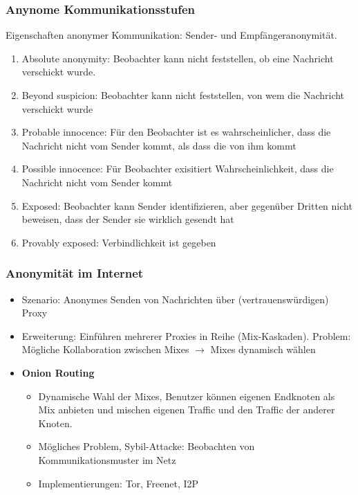\subsubsection{Anynome Kommunikationsstufen}
Eigenschaften anonymer Kommunikation: Sender- und Empfängeranonymität.
\begin{enumerate}
	\item Absolute anonymity: Beobachter kann nicht feststellen, ob eine Nachricht verschickt wurde.
	\item Beyond suspicion: Beobachter kann nicht feststellen, von wem die Nachricht verschickt wurde
	\item Probable innocence: Für den Beobachter ist es wahrscheinlicher, dass die Nachricht nicht vom Sender kommt, als dass die von ihm kommt
	\item Possible innocence: Für Beobachter exisitiert Wahrscheinlichkeit, dass die Nachricht nicht vom Sender kommt
	\item Exposed: Beobachter kann Sender identifizieren, aber gegenüber Dritten nicht beweisen, dass der Sender sie wirklich gesendt hat
	\item Provably exposed: Verbindlichkeit ist gegeben
\end{enumerate}

\subsubsection{Anonymität im Internet}
\begin{itemize}
	\item Szenario: Anonymes Senden von Nachrichten über (vertrauenswürdigen) Proxy
	\item Erweiterung: Einführen mehrerer Proxies in Reihe (Mix-Kaskaden). Problem: Mögliche Kollaboration zwischen Mixes $\rightarrow$ Mixes dynamisch wählen
	\item \textbf{Onion Routing}
	\begin{itemize}
		\item Dynamische Wahl der Mixes, Benutzer können eigenen Endknoten als Mix anbieten und mischen eigenen Traffic und den Traffic der anderer Knoten.
		\item Mögliches Problem, Sybil-Attacke: Beobachten von Kommunikationsmuster im Netz
		\item Implementierungen: Tor, Freenet, I2P
	\end{itemize}
\end{itemize}



